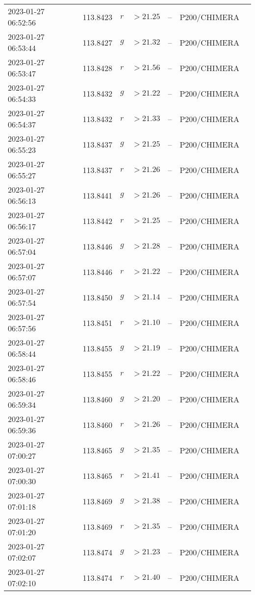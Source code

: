 \documentclass{nature_plusfigure}
\begin{document}
\begin{supplement}
\begin{center}
\begin{longtable}{lllllll}
2023-01-27 06:52:56 & 113.8423 & $r$ & $>21.25$ & -- & P200/CHIMERA &  \\ 
2023-01-27 06:53:44 & 113.8427 & $g$ & $>21.32$ & -- & P200/CHIMERA &  \\ 
2023-01-27 06:53:47 & 113.8428 & $r$ & $>21.56$ & -- & P200/CHIMERA &  \\ 
2023-01-27 06:54:33 & 113.8432 & $g$ & $>21.22$ & -- & P200/CHIMERA &  \\ 
2023-01-27 06:54:37 & 113.8432 & $r$ & $>21.33$ & -- & P200/CHIMERA &  \\ 
2023-01-27 06:55:23 & 113.8437 & $g$ & $>21.25$ & -- & P200/CHIMERA &  \\ 
2023-01-27 06:55:27 & 113.8437 & $r$ & $>21.26$ & -- & P200/CHIMERA &  \\ 
2023-01-27 06:56:13 & 113.8441 & $g$ & $>21.26$ & -- & P200/CHIMERA &  \\ 
2023-01-27 06:56:17 & 113.8442 & $r$ & $>21.25$ & -- & P200/CHIMERA &  \\ 
2023-01-27 06:57:04 & 113.8446 & $g$ & $>21.28$ & -- & P200/CHIMERA &  \\ 
2023-01-27 06:57:07 & 113.8446 & $r$ & $>21.22$ & -- & P200/CHIMERA &  \\ 
2023-01-27 06:57:54 & 113.8450 & $g$ & $>21.14$ & -- & P200/CHIMERA &  \\ 
2023-01-27 06:57:56 & 113.8451 & $r$ & $>21.10$ & -- & P200/CHIMERA &  \\ 
2023-01-27 06:58:44 & 113.8455 & $g$ & $>21.19$ & -- & P200/CHIMERA &  \\ 
2023-01-27 06:58:46 & 113.8455 & $r$ & $>21.22$ & -- & P200/CHIMERA &  \\ 
2023-01-27 06:59:34 & 113.8460 & $g$ & $>21.20$ & -- & P200/CHIMERA &  \\ 
2023-01-27 06:59:36 & 113.8460 & $r$ & $>21.26$ & -- & P200/CHIMERA &  \\ 
2023-01-27 07:00:27 & 113.8465 & $g$ & $>21.35$ & -- & P200/CHIMERA &  \\ 
2023-01-27 07:00:30 & 113.8465 & $r$ & $>21.41$ & -- & P200/CHIMERA &  \\ 
2023-01-27 07:01:18 & 113.8469 & $g$ & $>21.38$ & -- & P200/CHIMERA &  \\ 
2023-01-27 07:01:20 & 113.8469 & $r$ & $>21.35$ & -- & P200/CHIMERA &  \\ 
2023-01-27 07:02:07 & 113.8474 & $g$ & $>21.23$ & -- & P200/CHIMERA &  \\ 
2023-01-27 07:02:10 & 113.8474 & $r$ & $>21.40$ & -- & P200/CHIMERA &  \\ 

\end{longtable}
\end{center}
\end{supplement}
\end{document}
